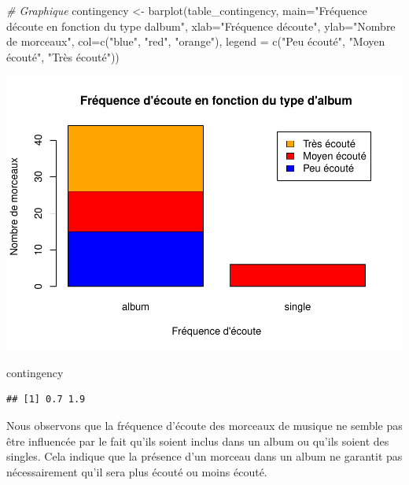 \documentclass[
]{article}
\newenvironment{Shaded}{\begin{snugshade}}{\end{snugshade}}
\newcommand{\AttributeTok}[1]{\textcolor[rgb]{0.77,0.63,0.00}{#1}}
\newcommand{\CommentTok}[1]{\textcolor[rgb]{0.56,0.35,0.01}{\textit{#1}}}
\newcommand{\FunctionTok}[1]{\textcolor[rgb]{0.00,0.00,0.00}{#1}}
\newcommand{\NormalTok}[1]{#1}
\newcommand{\OtherTok}[1]{\textcolor[rgb]{0.56,0.35,0.01}{#1}}
\newcommand{\StringTok}[1]{\textcolor[rgb]{0.31,0.60,0.02}{#1}}
\begin{document}
\begin{Shaded}
\begin{Highlighting}[]
\CommentTok{\# Graphique}
\NormalTok{contingency }\OtherTok{\textless{}{-}} \FunctionTok{barplot}\NormalTok{(table\_contingency, }\AttributeTok{main=}\StringTok{"Fréquence d\textquotesingle{}écoute en fonction du type d\textquotesingle{}album"}\NormalTok{, }
        \AttributeTok{xlab=}\StringTok{"Fréquence d\textquotesingle{}écoute"}\NormalTok{, }\AttributeTok{ylab=}\StringTok{"Nombre de morceaux"}\NormalTok{, }\AttributeTok{col=}\FunctionTok{c}\NormalTok{(}\StringTok{"blue"}\NormalTok{, }\StringTok{"red"}\NormalTok{, }\StringTok{"orange"}\NormalTok{),}
        \AttributeTok{legend =} \FunctionTok{c}\NormalTok{(}\StringTok{"Peu écouté"}\NormalTok{, }\StringTok{"Moyen écouté"}\NormalTok{, }\StringTok{"Très écouté"}\NormalTok{))}
\end{Highlighting}
\end{Shaded}

\includegraphics{spotify_analysis_files/figure-latex/unnamed-chunk-15-1.pdf}

\begin{Shaded}
\begin{Highlighting}[]
\NormalTok{contingency}
\end{Highlighting}
\end{Shaded}

\begin{verbatim}
## [1] 0.7 1.9
\end{verbatim}

Nous observons que la fréquence d'écoute des morceaux de musique ne
semble pas être influencée par le fait qu'ils soient inclus dans un
album ou qu'ils soient des singles. Cela indique que la présence d'un
morceau dans un album ne garantit pas nécessairement qu'il sera plus
écouté ou moins écouté.
\end{document}
